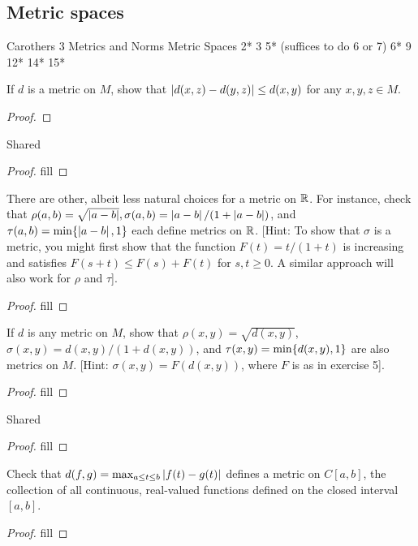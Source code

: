 \subsection{Metric spaces}

Carothers 3 Metrics and Norms
Metric Spaces
2*
3
5* (suffices to do 6 or 7)
6*
9
12*
14*
15*


\begin{exercise}{2}
If $d$ is a metric on $M$, show that $\left\lvert d(x,z)-d(y,z)\right\rvert\leq d(x,y)$ for any $x,y,z\in M$.
\end{exercise}
\begin{proof}

\end{proof} 

\begin{exercise}{3}
Shared
\end{exercise}
\begin{proof}
fill
\end{proof} 

\begin{exercise}{5}
There are other, albeit less natural choices for a metric on $\mathbb{R}$. For instance, check that $\rho(a,b)=\sqrt{\left\lvert a-b\right\rvert},\sigma(a,b)=\left\lvert a-b\right\rvert/(1+\left\lvert a-b\right\rvert)$, and $\tau(a,b)=\min\{\left\lvert a-b\right\rvert,1\}$ each define metrics on $\mathbb{R}$. [Hint: To show that $\sigma$ is a metric, you might first show that the function $F(t)=t/(1+t)$ is increasing and satisfies $F(s+t)\leq F(s)+F(t)$ for $s,t\geq 0$. A similar approach will also work for $\rho$ and $\tau$].
\end{exercise}
\begin{proof}
fill
\end{proof} 

\begin{exercise}{6}
If $d$ is any metric on $M$, show that $\rho(x,y)=\sqrt{d(x,y)}$, $\sigma(x,y)=d(x,y)/(1+d(x,y))$, and $\tau(x,y)=\min\{d(x,y),1\}$ are also metrics on $M$. [Hint: $\sigma(x,y)=F(d(x,y))$, where $F$ is as in exercise 5].
\end{exercise}
\begin{proof}
fill
\end{proof} 

\begin{exercise}{9}
Shared
\end{exercise}
\begin{proof}
fill
\end{proof} 

\begin{exercise}{12}
Check that $d(f,g)=\max_{a\leq t\leq b}\left\lvert f(t)-g(t)\right\rvert$ defines a metric on $C[a,b]$, the collection of all continuous, real-valued functions defined on the closed interval $[a,b]$.
\end{exercise}
\begin{proof}
fill
\end{proof} 

